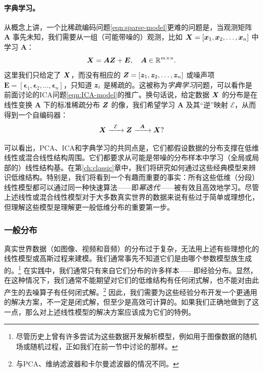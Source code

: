 \documentclass[../../book-main.tex]{subfiles}
\begin{document}
\paragraph{字典学习。}
从概念上讲，一个比稀疏编码问题\eqref{eqn:sparse-model}更难的问题是，当观测矩阵 $\boldsymbol{A}$ 事先未知，我们需要从一组（可能带噪的）观测，比如 $\bm{X} = [\bm{x}_1, \bm{x}_2, \ldots, \bm{x}_n]$ 中学习 $\boldsymbol{A}$：
\begin{equation}
    \bm{X} = \boldsymbol{A} \bm{Z} + \boldsymbol{E}, \quad \boldsymbol{A} \in \mathbb{R}^{m\times n}.
    \label{eqn:dictionary-learning}
\end{equation}
这里我们只给定了 $\bm{X}$，而没有相应的 $\bm{Z} = [\bm{z}_1, \bm{z}_2, \ldots, \bm{z}_n]$ 或噪声项 $\boldsymbol{E}= [\boldsymbol{\epsilon}_1, \boldsymbol{\epsilon}_2, \ldots, \boldsymbol{\epsilon}_n]$，只知道 $\bm{z}_i$ 是稀疏的。这被称为{\em 字典学习}问题，可以看作是前面讨论的ICA问题\eqref{eqn:ICA-model}的推广。换句话说，给定数据 $\bm{X}$ 的分布是在线性变换 $\boldsymbol{A}$ 下的标准稀疏分布 $\bm{Z}$ 的像，我们希望学习 $\boldsymbol{A}$ 及其“逆”映射 $\mathcal{E}$，从而得到一个自编码器：
\begin{equation}
    \bm{X}   \xrightarrow{\hspace{2mm} \mathcal{E} \hspace{2mm}}  \bm{Z} \xrightarrow{\hspace{2mm} \boldsymbol{A} \hspace{2mm}} \bm{X}?
       \label{eqn:decoding-DL}
\end{equation}

可以看出，PCA、ICA和字典学习的共同点是，它们都假设数据的分布支撑在低维线性或混合线性结构周围。它们都要求从可能是带噪的分布样本中学习（全局或局部的）线性结构基。在第\ref{ch:classic}章中，我们将研究如何通过这些经典模型来辨识低维结构。特别是，我们将看到一个有趣而重要的事实：所有这些低维（分段）线性模型都可以通过同一种快速算法——即{\em 幂迭代}\cite{Zhai-2020}——被有效且高效地学习。尽管上述线性或混合线性模型对于大多数真实世界的数据来说有些过于简单或理想化，但理解这些模型是理解更一般低维分布的重要第一步。

\subsubsection{一般分布}\label{sec:denoising-intro}

真实世界数据（如图像、视频和音频）的分布过于复杂，无法用上述有些理想化的线性模型或高斯过程来建模。我们通常事先不知道它们是由哪个参数模型族生成的。\footnote{尽管历史上曾有许多尝试为这些数据开发解析模型，例如用于图像数据的随机场或随机过程\cite{Mumford-1999}，正如我们在前一节中讨论的那样。} 在实践中，我们通常只有来自它们分布的许多样本——即经验分布。显然，在这种情况下，我们通常不能期望对它们的低维结构有任何闭式解，也不能对由此产生的去噪算子有任何闭式解。\footnote{与PCA、维纳滤波器和卡尔曼滤波器的情况不同。} 因此，我们需要为这些经验分布开发一个更通用的解决方案，不一定是闭式解，但至少是高效可计算的。如果我们正确地做到了这一点，那么对上述线性模型的解决方案应该成为它们的特例。
\end{document}
